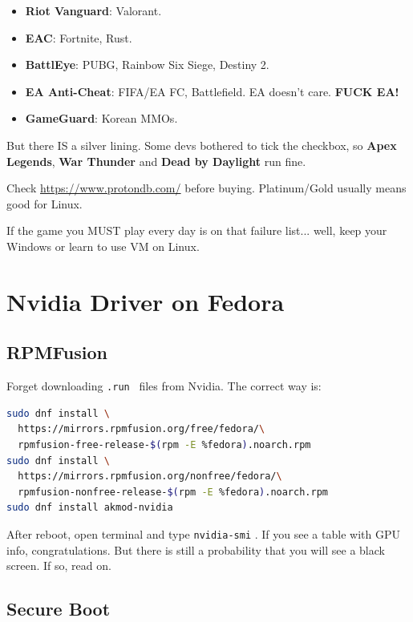 \documentclass[lang=en,color=blue,12pt]{elegantbook}
\let\oldtexttt\texttt
\renewcommand{\texttt}[1]{%
  \begingroup
  \setlength{\fboxsep}{1pt}%
  \colorbox{gray!10}{\oldtexttt{#1}}%
  \endgroup
}
\begin{document}
\begin{itemize}[itemsep=0pt, parsep=0pt, topsep=0pt, partopsep=0pt]
\item \textbf{Riot Vanguard}: Valorant.
\item \textbf{EAC}: Fortnite, Rust.
\item \textbf{BattlEye}: PUBG, Rainbow Six Siege, Destiny 2.
\item \textbf{EA Anti-Cheat}: FIFA/EA FC, Battlefield. EA
doesn't care. \textbf{FUCK EA!}
\item \textbf{GameGuard}: Korean MMOs.
\end{itemize}

But there IS a silver lining. Some devs bothered to tick the checkbox,
so \textbf{Apex Legends}, \textbf{War Thunder}
and \textbf{Dead by Daylight} run fine.

\begin{note}
Check \url{https://www.protondb.com/} before buying. Platinum/Gold usually means
good for Linux.
\end{note}

If the game you MUST play every day is on that failure list... well,
keep your Windows or learn to use VM on Linux.

\section{Nvidia Driver on Fedora}

\subsection{RPMFusion}

Forget downloading \texttt{.run}\ files from Nvidia. The correct way is:

\begin{lstlisting}[language=bash]
sudo dnf install \
  https://mirrors.rpmfusion.org/free/fedora/\
  rpmfusion-free-release-$(rpm -E %fedora).noarch.rpm
sudo dnf install \
  https://mirrors.rpmfusion.org/nonfree/fedora/\
  rpmfusion-nonfree-release-$(rpm -E %fedora).noarch.rpm
sudo dnf install akmod-nvidia
\end{lstlisting}

After reboot, open terminal and type \texttt{nvidia-smi}.
If you see a table with GPU info, congratulations.
But there is still a probability that you will see a black screen. If so, read on.

\subsection{Secure Boot}
\end{document}
